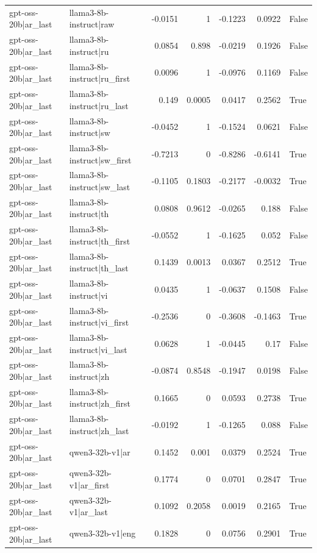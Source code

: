 \begin{table}
\begin{tabular}{l l r r r r l}
gpt-oss-20b|ar_last & llama3-8b-instruct|raw & -0.0151 & 1 & -0.1223 & 0.0922 & False \\
gpt-oss-20b|ar_last & llama3-8b-instruct|ru & 0.0854 & 0.898 & -0.0219 & 0.1926 & False \\
gpt-oss-20b|ar_last & llama3-8b-instruct|ru_first & 0.0096 & 1 & -0.0976 & 0.1169 & False \\
gpt-oss-20b|ar_last & llama3-8b-instruct|ru_last & 0.149 & 0.0005 & 0.0417 & 0.2562 & True \\
gpt-oss-20b|ar_last & llama3-8b-instruct|sw & -0.0452 & 1 & -0.1524 & 0.0621 & False \\
gpt-oss-20b|ar_last & llama3-8b-instruct|sw_first & -0.7213 & 0 & -0.8286 & -0.6141 & True \\
gpt-oss-20b|ar_last & llama3-8b-instruct|sw_last & -0.1105 & 0.1803 & -0.2177 & -0.0032 & True \\
gpt-oss-20b|ar_last & llama3-8b-instruct|th & 0.0808 & 0.9612 & -0.0265 & 0.188 & False \\
gpt-oss-20b|ar_last & llama3-8b-instruct|th_first & -0.0552 & 1 & -0.1625 & 0.052 & False \\
gpt-oss-20b|ar_last & llama3-8b-instruct|th_last & 0.1439 & 0.0013 & 0.0367 & 0.2512 & True \\
gpt-oss-20b|ar_last & llama3-8b-instruct|vi & 0.0435 & 1 & -0.0637 & 0.1508 & False \\
gpt-oss-20b|ar_last & llama3-8b-instruct|vi_first & -0.2536 & 0 & -0.3608 & -0.1463 & True \\
gpt-oss-20b|ar_last & llama3-8b-instruct|vi_last & 0.0628 & 1 & -0.0445 & 0.17 & False \\
gpt-oss-20b|ar_last & llama3-8b-instruct|zh & -0.0874 & 0.8548 & -0.1947 & 0.0198 & False \\
gpt-oss-20b|ar_last & llama3-8b-instruct|zh_first & 0.1665 & 0 & 0.0593 & 0.2738 & True \\
gpt-oss-20b|ar_last & llama3-8b-instruct|zh_last & -0.0192 & 1 & -0.1265 & 0.088 & False \\
gpt-oss-20b|ar_last & qwen3-32b-v1|ar & 0.1452 & 0.001 & 0.0379 & 0.2524 & True \\
gpt-oss-20b|ar_last & qwen3-32b-v1|ar_first & 0.1774 & 0 & 0.0701 & 0.2847 & True \\
gpt-oss-20b|ar_last & qwen3-32b-v1|ar_last & 0.1092 & 0.2058 & 0.0019 & 0.2165 & True \\
gpt-oss-20b|ar_last & qwen3-32b-v1|eng & 0.1828 & 0 & 0.0756 & 0.2901 & True \\

\end{tabular}
\end{table}
